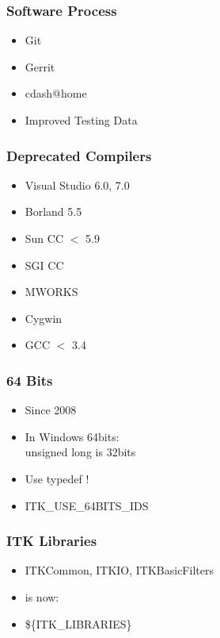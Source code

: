 





\begin{frame}
\frametitle{Software Process}
\Huge
\begin{itemize}
\item Git
\pause
\item Gerrit
\pause
\item cdash@home
\pause
\item Improved Testing Data
\end{itemize}
\end{frame}




\begin{frame}
\frametitle{Deprecated Compilers}
\Huge
\begin{itemize}
\item Visual Studio 6.0, 7.0
\pause
\item Borland 5.5
\pause
\item Sun CC $<$ 5.9
\pause
\item SGI CC
\pause
\item MWORKS
\pause
\item Cygwin
\pause
\item GCC $<$ 3.4
\end{itemize}
\end{frame}





\begin{frame}
\frametitle{64 Bits}
\Huge
\begin{itemize}
\item Since 2008
\pause
\item In Windows 64bits:\\unsigned long is 32bits
\pause
\item Use typedef !
\pause
\item ITK\_USE\_64BITS\_IDS
\end{itemize}
\end{frame}


\begin{frame}
\frametitle{ITK Libraries}
\Huge
\begin{itemize}
\item ITKCommon, ITKIO, ITKBasicFilters
\pause
\item is now:
\pause
\item \$\{ITK\_LIBRARIES\}
\end{itemize}
\end{frame}


